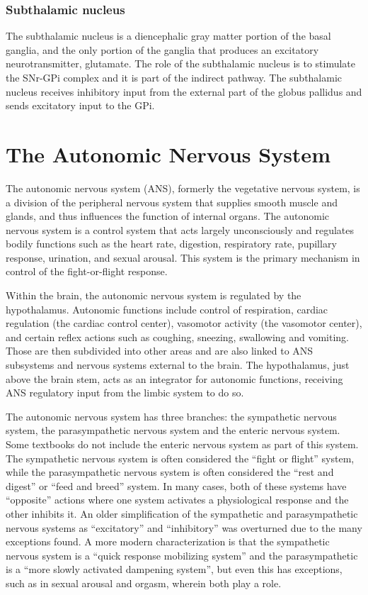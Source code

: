 \hypertarget{subthalamic-nucleus}{%
\subsection{Subthalamic nucleus}\label{subthalamic-nucleus}}

The subthalamic nucleus is a diencephalic gray matter portion of the basal ganglia, and the only portion of the ganglia that produces an excitatory neurotransmitter, glutamate. The role of the subthalamic nucleus is to stimulate the SNr-GPi complex and it is part of the indirect pathway. The subthalamic nucleus receives inhibitory input from the external part of the globus pallidus and sends excitatory input to the GPi.

\hypertarget{the-autonomic-nervous-system}{%
\chapter{The Autonomic Nervous System}\label{the-autonomic-nervous-system}}

The autonomic nervous system (ANS), formerly the vegetative nervous system, is a division of the peripheral nervous system that supplies smooth muscle and glands, and thus influences the function of internal organs. The autonomic nervous system is a control system that acts largely unconsciously and regulates bodily functions such as the heart rate, digestion, respiratory rate, pupillary response, urination, and sexual arousal. This system is the primary mechanism in control of the fight-or-flight response.

Within the brain, the autonomic nervous system is regulated by the hypothalamus. Autonomic functions include control of respiration, cardiac regulation (the cardiac control center), vasomotor activity (the vasomotor center), and certain reflex actions such as coughing, sneezing, swallowing and vomiting. Those are then subdivided into other areas and are also linked to ANS subsystems and nervous systems external to the brain. The hypothalamus, just above the brain stem, acts as an integrator for autonomic functions, receiving ANS regulatory input from the limbic system to do so.

The autonomic nervous system has three branches: the sympathetic nervous system, the parasympathetic nervous system and the enteric nervous system. Some textbooks do not include the enteric nervous system as part of this system. The sympathetic nervous system is often considered the ``fight or flight'' system, while the parasympathetic nervous system is often considered the ``rest and digest'' or ``feed and breed'' system. In many cases, both of these systems have ``opposite'' actions where one system activates a physiological response and the other inhibits it. An older simplification of the sympathetic and parasympathetic nervous systems as ``excitatory'' and ``inhibitory'' was overturned due to the many exceptions found. A more modern characterization is that the sympathetic nervous system is a ``quick response mobilizing system'' and the parasympathetic is a ``more slowly activated dampening system'', but even this has exceptions, such as in sexual arousal and orgasm, wherein both play a role.

